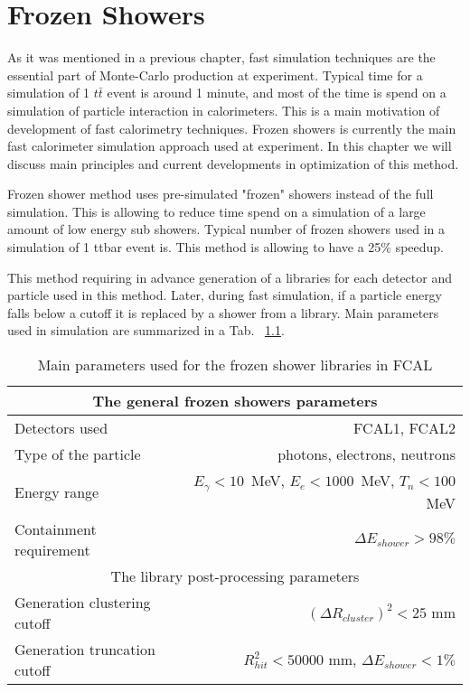 \chapter{Frozen Showers}\label{chap:FS}

As it was mentioned in a previous chapter, fast simulation techniques are the essential part of Monte-Carlo production at \atlas experiment. Typical time for a simulation of 1 $t\bar{t}$ event is around 1 minute, and most of the time is spend on a simulation of particle interaction in calorimeters. This is a main motivation of development of fast calorimetry techniques. 
Frozen showers is currently the main fast calorimeter simulation approach used at \atlas experiment. In this chapter we will discuss main principles and current developments in optimization of this method.

Frozen shower method uses pre-simulated "frozen" showers instead of the full simulation. This is allowing to reduce time spend on a simulation of a large amount of low energy sub showers. Typical number of frozen showers used in a simulation of 1 ttbar event is. This method is allowing to have a 25\% speedup. 

This method requiring in advance generation of a libraries for each detector and particle used in this method. Later, during fast simulation, if a particle energy falls below a cutoff it is replaced by a shower from a library. Main parameters used in \atlas simulation are summarized in a Tab. ~\ref{tab:MC_FS_params}. 

\begin{table}[b]
\caption{Main parameters used for the frozen shower libraries in FCAL }
\label{tab:MC_FS_params}
\centering
\begin{tabular}{l|r}
\hline
\hline
\multicolumn{2}{c}{The general frozen showers parameters} \\
\hline
Detectors used            & FCAL1, FCAL2\\
Type of the particle      & photons, electrons, neutrons \\
Energy range              &  $E_{\gamma}<10$~MeV,  $E_{e}<1000$~MeV,  $T_n<100$~MeV \\
Containment requirement   & $\Delta E_{shower} > 98\%$\\
\hline
\multicolumn{2}{c}{The library post-processing parameters} \\
\hline
Generation clustering cutoff & $(\Delta R_{cluster})^{2} < 25$ mm\\
Generation truncation cutoff & $R_{hit}^{2} < 50000$ mm, $\Delta E_{shower} < 1\%$\\
\hline
\hline
\end{tabular}

\end{table}

